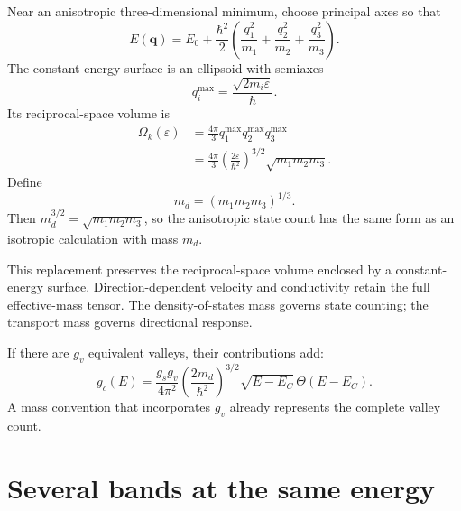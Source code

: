 Near an anisotropic three-dimensional minimum, choose principal axes so that
\begin{equation}
  E(\bm q)
  =E_0+\frac{\hbar^2}{2}
   \left(
     \frac{q_1^2}{m_1}
    +\frac{q_2^2}{m_2}
    +\frac{q_3^2}{m_3}
   \right).
  \label{eq:dos-anisotropic-parabolic-band}
\end{equation}
The constant-energy surface is an ellipsoid with semiaxes
\begin{equation}
  q_i^{\max}
  =\frac{\sqrt{2m_i\varepsilon}}{\hbar}.
  \label{eq:dos-ellipsoid-semi-axes}
\end{equation}
Its reciprocal-space volume is
\begin{equation}
\begin{aligned}
  \Omega_k(\varepsilon)
  &=\frac{4\pi}{3}q_1^{\max}q_2^{\max}q_3^{\max}\\
  &=\frac{4\pi}{3}
    \left(\frac{2\varepsilon}{\hbar^2}\right)^{3/2}
    \sqrt{m_1m_2m_3}.
\end{aligned}
  \label{eq:dos-ellipsoid-volume}
\end{equation}
Define
\begin{equation}
  \boxed{
  m_d=(m_1m_2m_3)^{1/3}.
  }
  \label{eq:dos-effective-mass-definition}
\end{equation}
Then $m_d^{3/2}=\sqrt{m_1m_2m_3}$, so the anisotropic state count has the same
form as an isotropic calculation with mass $m_d$.

This replacement preserves the reciprocal-space volume enclosed by a constant-
energy surface.  Direction-dependent velocity and conductivity retain the full
effective-mass tensor.  The density-of-states mass governs state counting; the
transport mass governs directional response.

If there are $g_v$ equivalent valleys, their contributions add:
\begin{equation}
  g_c(E)
  =\frac{g_sg_v}{4\pi^2}
   \left(\frac{2m_d}{\hbar^2}\right)^{3/2}
   \sqrt{E-E_C}\,\Theta(E-E_C).
  \label{eq:multivalley-conduction-dos}
\end{equation}
A mass convention that incorporates $g_v$ already represents the complete
valley count.

\section{Several bands at the same energy}

